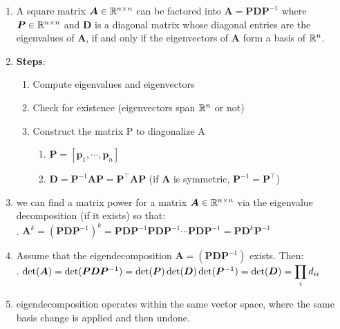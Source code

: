 \begin{enumerate}
    \item
    \begin{theorem}[Eigendecomposition]
        A square matrix $\bm{A} \in \mathbb{R}^{n\times n}$ can be factored into $\bm{A} = \bm{PDP}^{-1}$ where $\bm{P} \in \mathbb{R}^{n\times n}$ and $\bm{D}$ is a diagonal matrix whose diagonal entries are the eigenvalues of $\bm{A}$, if and only if the eigenvectors of $\bm{A}$ form a basis of $\mathbb{R}^n$.
        \hfill \cite{mfml/book/mml/Deisenroth-Faisal-Ong}
    \end{theorem}

    \item \textbf{Steps}:
    \begin{enumerate}
        \item Compute eigenvalues and eigenvectors

        \item Check for existence (eigenvectors span $\mathbb{R}^n$ or not)

        \item Construct the matrix P to diagonalize A
        \begin{enumerate}
            \item $\bm{P} = [\bm{p}_1, \cdots, \bm{p}_n]$

            \item $\bm{D} = \bm{P}^{-1}\bm{AP} = \bm{P}^{\top}\bm{AP}$
            \hfill (if $\bm{A}$ is symmetric, $\bm{P}^{-1} = \bm{P}^{\top}$)
        \end{enumerate}
    \end{enumerate}

    \item we can find a matrix power for a matrix $\bm{A} \in \mathbb{R}^{n\times n}$ via the eigenvalue decomposition (if it exists) so that:
    \hfill \cite{mfml/book/mml/Deisenroth-Faisal-Ong}
    \\
    .\hfill
    $
        \bm{A}^k
        = (\bm{PDP}^{-1})^k
        = \bm{PDP}^{-1}\bm{PDP}^{-1}\cdots \bm{PDP}^{-1}
        = \bm{PD}^k \bm{P}^{-1}
    $
    \hfill \cite{mfml/book/mml/Deisenroth-Faisal-Ong}

    \item Assume that the eigendecomposition $\bm{A} = (\bm{PDP}^{-1})$ exists. Then:
    \hfill \cite{mfml/book/mml/Deisenroth-Faisal-Ong}
    \\
    .\hfill
    $
        \det(\bm{A})
        = \det(\bm{PDP}^{ -1})
        = \det(\bm{P}) \det(\bm{D}) \det(\bm{P}^{-1})
        = \det(\bm{D})
        = \displaystyle\prod_{i} d_{ii}
    $
    \hfill \cite{mfml/book/mml/Deisenroth-Faisal-Ong}

    \item eigendecomposition operates within the same vector space, where the same basis change is applied and then undone.
    \hfill \cite{mfml/book/mml/Deisenroth-Faisal-Ong}
\end{enumerate}



